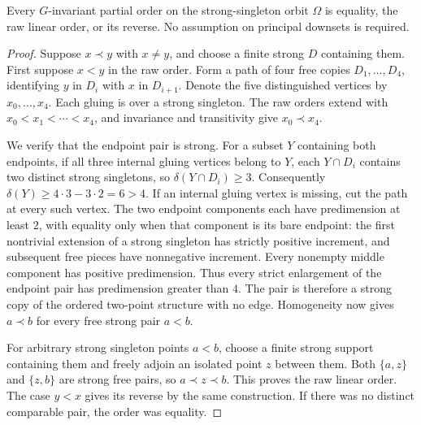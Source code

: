 \begin{lemma}
\label{G:singletonpartial}
Every $G$-invariant partial order on the strong-singleton orbit
$\Omega$ is equality, the raw linear order, or its reverse.
No assumption on principal downsets is required.
\end{lemma}
\begin{proof}
Suppose $x\prec y$ with $x\ne y$, and choose a finite strong
$D$ containing them. First suppose $x<y$ in the raw order.
Form a path of four free copies $D_1,\ldots,D_4$, identifying
$y$ in $D_i$ with $x$ in $D_{i+1}$. Denote the five distinguished
vertices by $x_0,\ldots,x_4$. Each gluing is over a strong
singleton. The raw orders extend with
$x_0<x_1<\cdots<x_4$, and invariance and transitivity give
$x_0\prec x_4$.

We verify that the endpoint pair is strong. For a subset $Y$
containing both endpoints, if all three internal gluing vertices
belong to $Y$, each $Y\cap D_i$ contains two distinct strong
singletons, so $\delta(Y\cap D_i)\ge3$. Consequently
$\delta(Y)\ge4\cdot3-3\cdot2=6>4$.
If an internal gluing vertex is missing, cut the path at every
such vertex. The two endpoint components each have predimension
at least $2$, with equality only when that component is its bare
endpoint: the first nontrivial extension of a strong singleton
has strictly positive increment, and subsequent free pieces have
nonnegative increment. Every nonempty middle component has
positive predimension. Thus every strict enlargement of the
endpoint pair has predimension greater than $4$.
The pair is therefore a strong copy of the ordered two-point
structure with no edge. Homogeneity now gives $a\prec b$ for
every free strong pair $a<b$.

For arbitrary strong singleton points $a<b$, choose a finite
strong support containing them and freely adjoin an isolated
point $z$ between them. Both $\{a,z\}$ and $\{z,b\}$ are strong
free pairs, so $a\prec z\prec b$. This proves the raw linear
order. The case $y<x$ gives its reverse by the same construction.
If there was no distinct comparable pair, the order was equality.
\end{proof}

